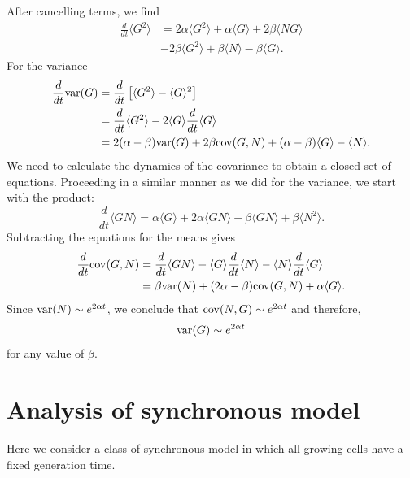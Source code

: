 \documentclass{article}
\begin{document}
After cancelling terms, we find
\begin{align}
\frac{d}{dt}\langle  G^2\rangle  &= 2 \alpha \langle G^2 \rangle  + \alpha \langle G \rangle + 2 \beta \langle N G \rangle \\
&- 2 \beta \langle G^2 \rangle  + \beta \langle N \rangle  - \beta \langle G\rangle. 
\end{align}
For the variance 
\begin{align}
\frac{d}{dt}{\rm var}(G) &= \frac{d}{dt} \left[\langle G^2 \rangle - \langle G \rangle^2 \right]\\
&= \frac{d}{dt} \langle G^2 \rangle  - 2\langle G \rangle \frac{d}{dt} \langle G \rangle\\
&= 2 (\alpha - \beta){\rm var}(G) + 2 \beta {\rm cov}(G,N) + (\alpha-\beta)\langle G \rangle  - \langle  N\rangle. 
\end{align} 
We need to calculate the dynamics of the covariance to obtain a closed set of equations. Proceeding in a similar manner as we did for the variance, we start with the product:
\begin{equation}
\frac{d}{dt}\langle G N \rangle  = \alpha \langle  G\rangle  + 2\alpha \langle G N \rangle  - \beta \langle G N \rangle  + \beta \langle N^2 \rangle. 
\end{equation}
Subtracting the equations for the means gives 
\begin{align}
\frac{d}{dt} {\rm cov}(G,N) &= \frac{d}{dt}\langle G N\rangle  - \langle G  \rangle \frac{d}{dt}\langle  N\rangle  -  \langle N  \rangle \frac{d}{dt}\langle  G\rangle\\
&= \beta {\rm var}(N) + (2\alpha - \beta){\rm cov}(G,N) + \alpha \langle G \rangle. 
\end{align}
Since ${\rm var}(N) \sim e^{2 \alpha t}$, we conclude that ${\rm cov}(N,G) \sim e^{2\alpha t}$ and therefore,  
\begin{equation}
{\rm var}(G) \sim e^{2\alpha t}
\end{equation}
for any value of $\beta$. 



\section{Analysis of synchronous model}\label{app:sync}
Here we consider a class of synchronous model in which all growing cells have a fixed generation time.  
\end{document}
